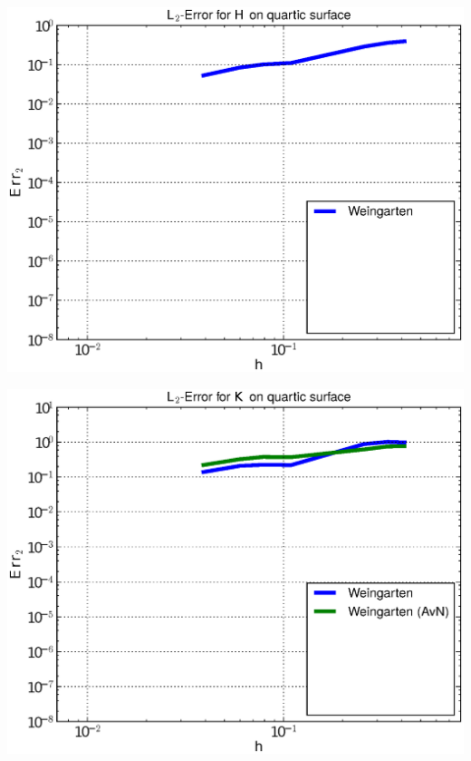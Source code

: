 \documentclass{beamer}
\begin{document}
\begin{frame}
\begin{overprint}
\begin{minipage}[t]{0.49\textwidth}
            \centering\includegraphics[width=\textwidth]{bilder/Curvature/heineB/ErrHL2_1.eps}
          \end{minipage}
          \begin{minipage}[t]{0.49\textwidth}
            \centering\includegraphics[width=\textwidth]{bilder/Curvature/heineB/ErrKL2_2.eps}
          \end{minipage}\hfill
          \begin{minipage}[t]{0.49\textwidth}

\end{minipage}
\end{overprint}
\end{frame}
\end{document}

